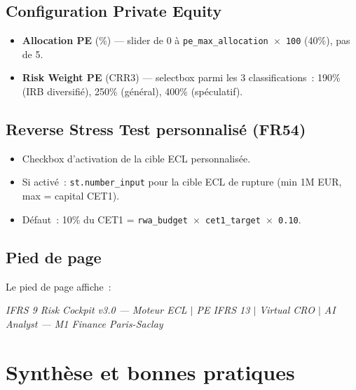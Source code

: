 \documentclass[12pt,a4paper]{article}
\begin{document}
\subsection{Configuration Private Equity}

\begin{itemize}[leftmargin=2em]
    \item \textbf{Allocation PE} (\%) --- slider de 0 \`a \texttt{pe\_max\_allocation $\times$ 100} (40\%), pas de 5.
    \item \textbf{Risk Weight PE} (CRR3) --- selectbox parmi les 3 classifications~: 190\% (IRB diversifi\'e), 250\% (g\'en\'eral), 400\% (sp\'eculatif).
\end{itemize}

\subsection{Reverse Stress Test personnalis\'e (FR54)}

\begin{itemize}[leftmargin=2em]
    \item Checkbox d'activation de la cible ECL personnalis\'ee.
    \item Si activ\'e~: \texttt{st.number\_input} pour la cible ECL de rupture (min 1M EUR, max = capital CET1).
    \item D\'efaut~: 10\% du CET1 = \texttt{rwa\_budget $\times$ cet1\_target $\times$ 0.10}.
\end{itemize}

\subsection{Pied de page}

Le pied de page affiche~:
\begin{center}
\textit{IFRS 9 Risk Cockpit v3.0 --- Moteur ECL $|$ PE IFRS 13 $|$ Virtual CRO $|$ AI Analyst --- M1 Finance Paris-Saclay}
\end{center}


\section{Synth\`ese et bonnes pratiques}
\label{sec:synthese}
\end{document}
